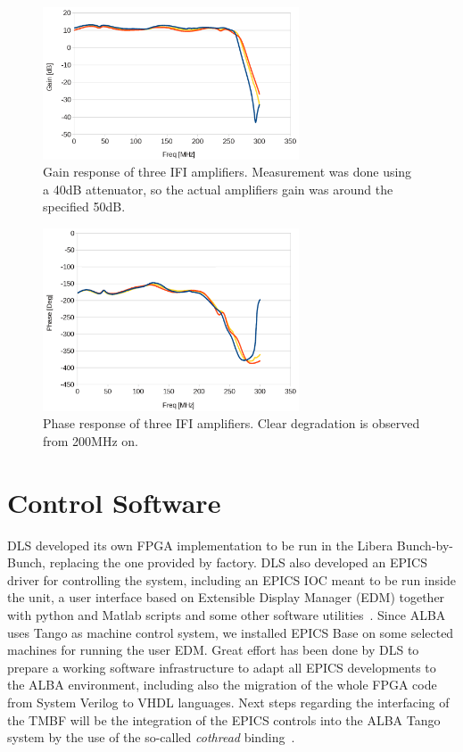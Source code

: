\documentclass[a4paper,
              ]{jacow}
\begin{document}
\begin{figure}[hbt!]
   \centering
   \includegraphics[width=76mm]{img/TUPB046f2}
   \caption{Gain response of three IFI amplifiers. Measurement was done using a 40dB attenuator, so the actual amplifiers gain was around the specified 50dB.}
   \label{AMPLI:GAIN}
\end{figure}

\begin{figure}[hbt!]
   \centering
   \includegraphics[width=76mm]{img/TUPB046f3}
   \caption{Phase response of three IFI amplifiers. Clear degradation is observed from 200MHz on.}
   \label{AMPLI:PHASE}
\end{figure}


\section{Control Software}

DLS developed its own FPGA implementation to be run in the Libera Bunch-by-Bunch, replacing the one provided by factory. DLS also developed an EPICS driver for controlling 
the system, including an EPICS IOC meant to be run inside the unit, a user interface based on Extensible Display Manager (EDM) together with python and Matlab scripts and some other software utilities~\cite{DLS:IBIC15, DLS:EPAC08, DLS:IBIC13}. 
Since ALBA uses Tango as machine control system, we installed EPICS Base on some selected machines for running the user EDM. Great effort has been done by DLS to prepare a working software infrastructure to adapt all EPICS developments to the ALBA environment, including also the migration of the whole FPGA code from System Verilog to VHDL languages. Next steps regarding the interfacing of the TMBF will be the integration of the EPICS controls into the ALBA Tango system by the use of the so-called \textit{cothread} binding~\cite{DLS:cothread}.
\end{document}

